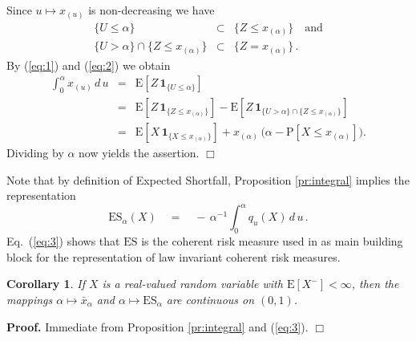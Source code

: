 \documentclass[11pt,a4paper,leqno]{article}
\newtheorem{corollary}[theorem]{Corollary}
\begin{document}
Since $u \mapsto x_{(u)}$ is non-decreasing we have
\begin{eqnarray}
  \label{eq:1}
\{ U \le \alpha\} & \subset & \{ Z \le x_{(\alpha)}\}\quad \mbox{and}\\
\label{eq:2}
\{ U >  \alpha\} \cap \{ Z \le x_{(\alpha)}\} & \subset &
\{ Z = x_{(\alpha)}\}\,.
\end{eqnarray}
By (\ref{eq:1}) and (\ref{eq:2}) we obtain
\begin{eqnarray*}
 \int_0^\alpha x_{(u)}\,d\,u & = & \mathrm{E}[Z\,\mathbf{1}_{\{U \le \alpha\}}]\\
& = & \mathrm{E}[Z\,\mathbf{1}_{\{Z \le x_{(\alpha)}\}}] 
- \mathrm{E}[Z\,\mathbf{1}_{\{ U >  \alpha\} \cap\{Z \le x_{(\alpha)}\}}] \\
& = & \mathrm{E}[X\,\mathbf{1}_{\{X \le x_{(\alpha)}\}}] + 
x_{(\alpha)}\,\Big( \alpha - \mathrm{P}[X \le x_{(\alpha)}]\Big).
\end{eqnarray*}
Dividing by $\alpha$ now yields the assertion. \hfill $\Box$

Note that by definition of Expected Shortfall, Proposition \ref{pr:integral}
implies the representation
\begin{equation}
  \label{eq:3}
\mathrm{ES}_\alpha(X) \quad = \quad - \,\alpha^{-1} \int_0^\alpha q_u(X)\,d\,u\,.
\end{equation}
Eq.~(\ref{eq:3}) shows that $\mathrm{ES}$ is the coherent risk measure used in \cite{Kusuoka}
as main building block for the representation of law invariant coherent risk measures.

\begin{corollary} \label{pr:cont} 
If $X$ is a real-valued random variable with $\mathrm{E}[X^-] < \infty$, then the mappings
$\alpha \mapsto \bar{x}_\alpha$ and $\alpha \mapsto \mathrm{ES}_\alpha$ are continuous on
$(0,1)$.
\end{corollary}
%
\textbf{Proof.} Immediate from Proposition \ref{pr:integral} and (\ref{eq:3}).
\hfill $\Box$
\end{document}
